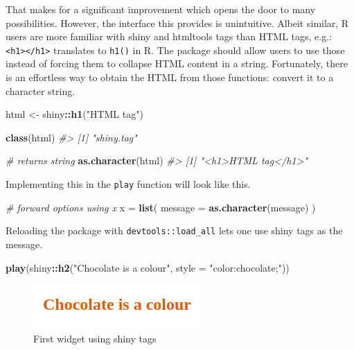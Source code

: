 \documentclass[
]{krantz}
\makeatletter
\newenvironment{Shaded}{\begin{snugshade}}{\end{snugshade}}
\newcommand{\CommentTok}[1]{\textcolor[rgb]{0.37,0.37,0.37}{\textit{#1}}}
\newcommand{\DataTypeTok}[1]{\textcolor[rgb]{0.27,0.27,0.27}{#1}}
\newcommand{\KeywordTok}[1]{\textcolor[rgb]{0.27,0.27,0.27}{\textbf{#1}}}
\newcommand{\NormalTok}[1]{#1}
\newcommand{\OperatorTok}[1]{\textcolor[rgb]{0.43,0.43,0.43}{\textbf{#1}}}
\newcommand{\StringTok}[1]{\textcolor[rgb]{0.5,0.5,0.5}{#1}}
\newenvironment{kframe}{%
\medskip{}
\setlength{\fboxsep}{.8em}
 \def\at@end@of@kframe{}%
 \ifinner\ifhmode%
  \def\at@end@of@kframe{\end{minipage}}%
  \begin{minipage}{\columnwidth}%
 \fi\fi%
 \def\FrameCommand##1{\hskip\@totalleftmargin \hskip-\fboxsep
 \colorbox{shadecolor}{##1}\hskip-\fboxsep
     \hskip-\linewidth \hskip-\@totalleftmargin \hskip\columnwidth}%
 \MakeFramed {\advance\hsize-\width
   \@totalleftmargin\z@ \linewidth\hsize
   \@setminipage}}%
 {\par\unskip\endMakeFramed%
 \at@end@of@kframe}
\renewenvironment{Shaded}{\begin{kframe}}{\end{kframe}}
\makeatother
\begin{document}
That makes for a significant improvement which opens the door to many possibilities. However, the interface this provides is unintuitive. Albeit similar, R users are more familiar with shiny and htmltools \citep{R-htmltools} tags than HTML tags, e.g.: \texttt{\textless{}h1\textgreater{}\textless{}/h1\textgreater{}} translates to \texttt{h1()} in R. The package should allow users to use those instead of forcing them to collapse HTML content in a string. Fortunately, there is an effortless way to obtain the HTML from those functions: convert it to a character string.

\begin{Shaded}
\begin{Highlighting}[]
\NormalTok{html <{-}}\StringTok{ }\NormalTok{shiny}\OperatorTok{::}\KeywordTok{h1}\NormalTok{(}\StringTok{"HTML tag"}\NormalTok{)}

\KeywordTok{class}\NormalTok{(html)}
\CommentTok{\#> [1] "shiny.tag"}

\CommentTok{\# returns string}
\KeywordTok{as.character}\NormalTok{(html)}
\CommentTok{\#> [1] "<h1>HTML tag</h1>"}
\end{Highlighting}
\end{Shaded}

Implementing this in the \texttt{play} function will look like this.

\begin{Shaded}
\begin{Highlighting}[]
\CommentTok{\# forward options using x}
\NormalTok{x =}\StringTok{ }\KeywordTok{list}\NormalTok{(}
  \DataTypeTok{message =} \KeywordTok{as.character}\NormalTok{(message)}
\NormalTok{)}
\end{Highlighting}
\end{Shaded}

Reloading the package with \texttt{devtools::load\_all} lets one use shiny tags as the message.

\begin{Shaded}
\begin{Highlighting}[]
\KeywordTok{play}\NormalTok{(shiny}\OperatorTok{::}\KeywordTok{h2}\NormalTok{(}\StringTok{"Chocolate is a colour"}\NormalTok{, }\DataTypeTok{style =} \StringTok{"color:chocolate;"}\NormalTok{))}
\end{Highlighting}
\end{Shaded}

\begin{figure}[t]

{\centering \includegraphics[width=1\linewidth]{images/playground-color} 

}

\caption{First widget using shiny tags}\label{fig:playground-tags}
\end{figure}
\end{document}
